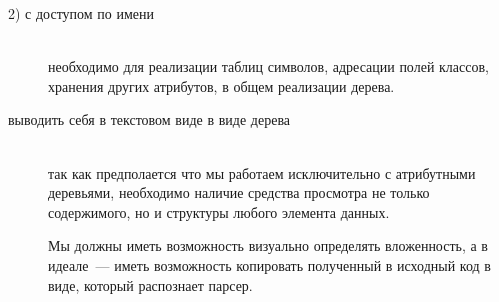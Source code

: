 \begin{description}

\item[2) с доступом по имени]\ \\необходимо для реализации таблиц
символов, адресации полей классов, хранения других атрибутов, в общем
реализации  дерева.


\item[выводить себя в текстовом виде в виде дерева]\ \\так как предполается что
мы работаем исключительно с атрибутными деревьями, необходимо наличие средства
просмотра не только содержимого, но и структуры любого элемента данных.

Мы должны иметь возможность визуально определять вложенность, а в идеале\ ---
иметь возможность копировать полученный  в исходный код в
виде, который распознает парсер.

\end{description}
